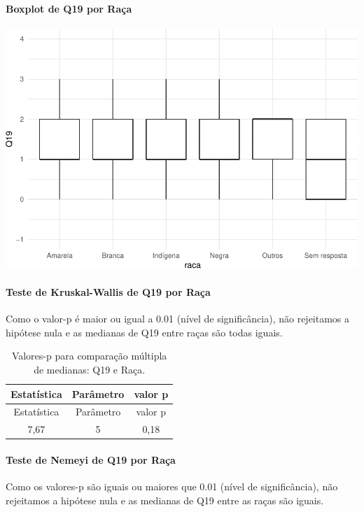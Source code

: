\documentclass[]{article}
\let\oldparagraph\paragraph
\renewcommand{\paragraph}[1]{\oldparagraph{#1}\mbox{}}
\begin{document}
\hypertarget{boxplot-de-q19-por-rauxe7a}{%
\paragraph{Boxplot de Q19 por Raça}\label{boxplot-de-q19-por-rauxe7a}}

\begin{center}\includegraphics[width=0.75\linewidth]{relatorio_covid19_files/figure-latex/unnamed-chunk-343-1} \end{center}

\hypertarget{teste-de-kruskal-wallis-de-q19-por-rauxe7a}{%
\paragraph{Teste de Kruskal-Wallis de Q19 por Raça}\label{teste-de-kruskal-wallis-de-q19-por-rauxe7a}}

Como o valor-p é maior ou igual a 0.01 (nível de significância), não rejeitamos a hipótese nula e as medianas de Q19 entre raças são todas iguais.

\begin{longtable}[]{@{}ccc@{}}
\caption{\label{tab:unnamed-chunk-345}Valores-p para comparação múltipla de medianas: Q19 e Raça.}\tabularnewline
\toprule
Estatística & Parâmetro & valor p\tabularnewline
\midrule
\endfirsthead
\toprule
Estatística & Parâmetro & valor p\tabularnewline
\midrule
\endhead
7,67 & 5 & 0,18\tabularnewline
\bottomrule
\end{longtable}

\hypertarget{teste-de-nemeyi-de-q19-por-rauxe7a}{%
\paragraph{Teste de Nemeyi de Q19 por Raça}\label{teste-de-nemeyi-de-q19-por-rauxe7a}}

Como os valores-p são iguais ou maiores que 0.01 (nível de significância), não rejeitamos a hipótese nula e as medianas de Q19 entre as raças são iguais.
\end{document}
